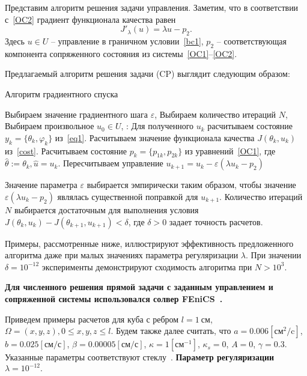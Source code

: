 \documentclass[12pt]{article}
\begin{document}
    Представим алгоритм решения задачи управления.
    Заметим, что в соответствии с~\eqref{OC2} градиент функционала качества равен
    \[
        J'_\lambda (u) = \lambda u - p_2.
    \]
    Здесь $u\in U$ -- управление в граничном условии~\eqref{bc1}, $p_2$ -- соответствующая компонента
    сопряженного состояния из системы~\eqref{OC1}--\eqref{OC2}.

    Предлагаемый алгоритм решения задачи (CP) выглядит следующим образом:
    \begin{algorithm}[H]
        \caption{Алгоритм градиентного спуска}
        \begin{algorithmic}[1]
            \State Выбираем значение градиентного шага $\varepsilon$,
            \State Выбираем количество итераций $N$,
            \State Выбираем произвольное $u_0 \in U$,
            :
            \State Для полученного $u_k$ расчитываем состояние $y_k = \{\theta_k, \varphi_k\}$ из~\eqref{eq1}.
            \State Расчитываем значение функционала качества $J(\theta_k, u_k)$ из~\eqref{cost}.
            \State Расчитываем состояние $p_k=\{p_{1k},p_{2k}\}$ из уравнений~\eqref{OC1},
            где $ \hat{\theta} := \theta_k, \hat{u}=u_k$.
            \State Пересчитываем управление $u_{k+1} = u_k - \varepsilon (\lambda u_k - p_2)$
            \EndFor
        \end{algorithmic}
    \end{algorithm}
    Значение параметра $\varepsilon$ выбирается эмпирически таким образом, чтобы значение
    $\varepsilon (\lambda u_k - p_2)$ являлась существенной поправкой для $u_{k+1}$.
    Количество итераций $N$ выбирается достаточным для выполнения условия
    $J(\theta_k, u_k) - J(\theta_{k+1}, u_{k+1}) < \delta$, где $\delta>0$ задает точность расчетов.

    Примеры, рассмотренные ниже, иллюстрируют эффективность предложенного алгоритма даже при
    малых значениях параметра регуляризации $\lambda.$
    При значении $\delta=10^{-12}$ эксперименты демонстрируют сходимость алгоритма при $N > 10^{3}$.

    \textbf{Для численного решения прямой задачи с заданным управлением и сопряженной системы
    использовался солвер FEniCS~\cite{fenics, dolfin}.}


    Приведем примеры расчетов для куба с ребром $l=1~\text{см}$,
    $\Omega = {(x, y, z), 0 \leq x,y,z \leq l}$.
    Будем также далее считать, что $a = 0.006[\text{см}^2/\text{c}]$,
    $b=0.025[\text{см}/\text{с}]$, $\beta = 0.00005[\text{см}/\text{с}]$,
    $\kappa=1[\text{см}^{-1}]$, $\kappa_s = 0$, $A = 0$, $\gamma = 0.3$.
    Указанные параметры соответствуют стеклу~\cite{Grenkin5}. \textbf{Параметр регуляризации $\lambda=10^{-12}.$}
\end{document}
